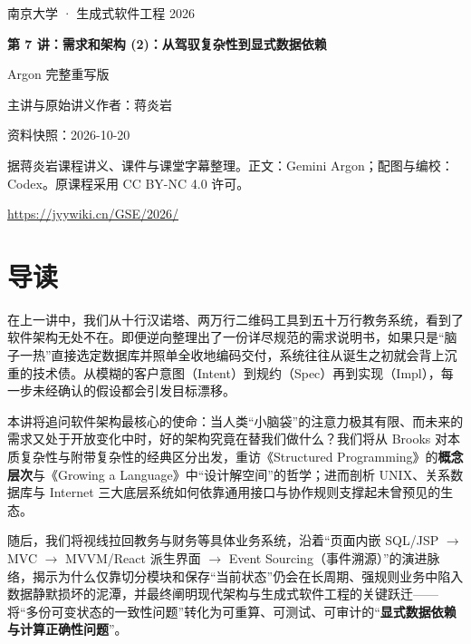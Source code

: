 \documentclass[UTF8,a4paper,11pt,fontset=fandol]{ctexart}
\begin{document}
\begin{titlepage}\centering\vspace*{25mm}

{\Large 南京大学 · 生成式软件工程 2026\par}\vspace{12mm}

{\Huge\bfseries 第 7 讲：需求和架构 (2)：从驾驭复杂性到显式数据依赖\par}\vspace{10mm}

{\Large Argon 完整重写版\par}\vspace{10mm}

主讲与原始讲义作者：蒋炎岩\par

资料快照：2026-10-20\par\vfill

据蒋炎岩课程讲义、课件与课堂字幕整理。正文：Gemini Argon；配图与编校：Codex。原课程采用 CC BY-NC 4.0 许可。

\vspace{8mm}\url{https://jyywiki.cn/GSE/2026/}

\end{titlepage}

\tableofcontents\clearpage

\section*{导读}

在上一讲中，我们从十行汉诺塔、两万行二维码工具到五十万行教务系统，看到了软件架构无处不在。即便逆向整理出了一份详尽规范的需求说明书，如果只是“脑子一热”直接选定数据库并照单全收地编码交付，系统往往从诞生之初就会背上沉重的技术债。从模糊的客户意图（Intent）到规约（Spec）再到实现（Impl），每一步未经确认的假设都会引发目标漂移。

本讲将追问软件架构最核心的使命：当人类“小脑袋”的注意力极其有限、而未来的需求又处于开放变化中时，好的架构究竟在替我们做什么？我们将从 Brooks 对本质复杂性与附带复杂性的经典区分出发，重访《Structured Programming》的\textbf{概念层次}与《Growing a Language》中“设计解空间”的哲学；进而剖析 UNIX、关系数据库与 Internet 三大底层系统如何依靠通用接口与协作规则支撑起未曾预见的生态。

随后，我们将视线拉回教务与财务等具体业务系统，沿着“页面内嵌 SQL/JSP \ensuremath{\rightarrow} MVC \ensuremath{\rightarrow} MVVM/React 派生界面 \ensuremath{\rightarrow} Event Sourcing（事件溯源）”的演进脉络，揭示为什么仅靠切分模块和保存“当前状态”仍会在长周期、强规则业务中陷入数据静默损坏的泥潭，并最终阐明现代架构与生成式软件工程的关键跃迁——将“多份可变状态的一致性问题”转化为可重算、可测试、可审计的“\textbf{显式数据依赖与计算正确性问题}”。
\end{document}
